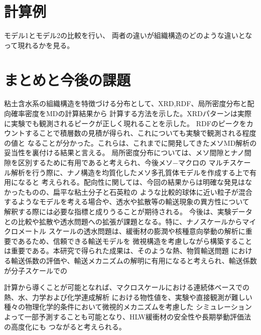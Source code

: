 ﻿\documentclass[11pt,a4j]{jarticle}
\begin{document}
\section{計算例}

モデル1とモデル2の比較を行い、
両者の違いが組織構造のどのような違いとなって現れるかを見る。
\section{まとめと今後の課題}
粘土含水系の組織構造を特徴づける分布として、XRD,RDF、局所密度分布と配向確率密度をMDの計算結果から
計算する方法を示した。XRDパターンは実際に実験でも観測されるピークが正しく現れることを示した。
RDFのピークをカウントすることで積層数の見積が得られ、これについても実験で観測される程度の値と
なることが分かった。これらは、これまでに開発してきたメソMD解析の妥当性を裏付ける結果と言える。
局所密度分布については、メソ間隙とナノ間隙を区別するために有用であると考えられ、今後メソ−マクロの
マルチスケール解析を行う際に、ナノ構造を均質化したメソ多孔質体モデルを作成する上で有用になると
考えられる。配向性に関しては、今回の結果からは明確な発見はなかったものの、扁平な粘土分子と石英粒の
ような比較的球体に近い粒子が混合するようなモデルを考える場合や、透水や拡散等の輸送現象の異方性について
解釈する際には必要な指標と成りうることが期待される。
今後は、実験データとの比較や拡散や透水問題への拡張が課題となる。特に、ナノスケールからマイクロメートル
スケールの透水問題は、緩衝材の膨潤や核種意向挙動の解析に重要であるため、信頼できる輸送モデルを
微視構造を考慮しながら構築することは重要である。本研究で得られた成果は、そのような熱、物質輸送問題
における輸送係数の評価や、輸送メカニズムの解明に有用になると考えられ、輸送係数が分子スケールでの

計算から導くことが可能となれば、マクロスケールにおける連続体ベースでの熱、水、力学および化学連成解析
における物性値を、実験や直接観測が難しい種々の物理化学的条件において微視的メカニズムを考慮した
シミュレーションよって一部予測することも可能となり、HLW緩衝材の安全性や長期挙動評価法の高度化にも
つながると考えられる。
\end{document}
